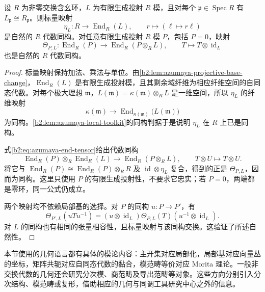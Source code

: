 \begin{proposition}\label{b2:prop:C-line-twist-invariance}
	设 \(R\) 为非零交换含幺环，\(L\) 为有限生成投射 \(R\) 模，且对每个 \(\mathfrak p\in\operatorname{Spec}R\) 有 \(L_{\mathfrak p}\cong R_{\mathfrak p}\)。则标量映射
	\[
		\eta_L:R\longrightarrow\operatorname{End}_R(L), \qquad r\longmapsto(\ell\mapsto r\ell)
	\]
	是自然的 \(R\) 代数同构。对任意有限生成投射 \(R\) 模 \(P\)，包括 \(P=0\)，映射
	\[
		\Theta_{P,L}:\operatorname{End}_R(P) \longrightarrow\operatorname{End}_R(P\otimes_RL), \qquad T\longmapsto T\otimes\operatorname{id}_L
	\]
	也是自然的 \(R\) 代数同构。
\end{proposition}
\begin{proof}
	标量映射保持加法、乘法与单位。由\cref{b2:lem:azumaya-projective-base-change}，\(\operatorname{End}_R(L)\) 是有限生成投射模，且其剩余域纤维为相应纤维空间的自同态代数。对每个极大理想 \(\mathfrak m\)，\(L(\mathfrak m)=\kappa(\mathfrak m)\otimes_RL\) 是一维空间，所以 \(\eta_L\) 的纤维映射
	\[
		\kappa(\mathfrak m)\longrightarrow \operatorname{End}_{\kappa(\mathfrak m)}\bigl(L(\mathfrak m)\bigr)
	\]
	为同构。\cref{b2:lem:azumaya-local-toolkit}的同构判据于是说明 \(\eta_L\) 在 \(R\) 上已是同构。

	式\eqref{b2:eq:azumaya-end-tensor}给出代数同构
	\[
		\operatorname{End}_R(P)\otimes_R\operatorname{End}_R(L) \longrightarrow\operatorname{End}_R(P\otimes_RL), \qquad T\otimes U\longmapsto T\otimes U.
	\]
	将它与 \(\operatorname{End}_R(P)\cong\operatorname{End}_R(P)\otimes_RR\) 及 \(\operatorname{id}\otimes\eta_L\) 复合，得到的正是 \(\Theta_{P,L}\)，因而为同构。这里只使用 \(P\) 的有限生成投射性，不要求它忠实；若 \(P=0\)，两端都是零环，同一公式仍成立。

	两个映射均不依赖局部基的选择。对 \(P\) 的同构 \(u:P\to P'\)，有
	\[
		\Theta_{P',L}(uTu^{-1}) =(u\otimes\operatorname{id}_L)\Theta_{P,L}(T) (u^{-1}\otimes\operatorname{id}_L).
	\]
	对 \(L\) 的同构也有相同的张量相容性，且标量映射与该同构交换。这验证了所述自然性。
\end{proof}

本节使用的几何语言都有具体的模论内容：主开集对应局部化，局部基对应向量丛的坐标，矩阵共轭对应自同态代数的黏合，模范畴等价对应 Morita 理论。一般非交换代数的几何还会研究分次模、商范畴及导出范畴等对象。这些方向分别引入分次结构、模范畴或复形，借助相应的几何与同调工具研究中心之外的信息。
